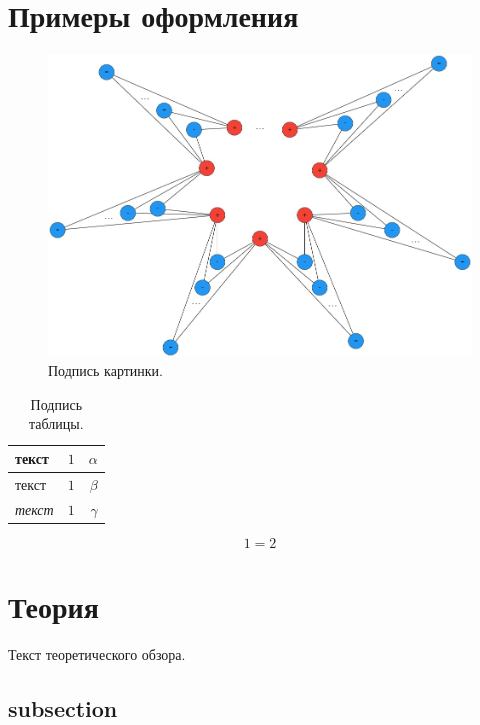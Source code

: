 \documentclass[a4paper, 14pt]{extreport}
\begin{document}
\section{Примеры оформления}

\begin{figure}[h]
    \centering
    \includegraphics[scale=0.25]{img/graph.jpg}
    \caption{Подпись картинки.}
    \label{fig:example fig 1}
\end{figure}

\begin{table}[h]
    \centering
    \caption{Подпись таблицы.}
    \begin{tabular}{lc|r}
        \textbf{текст} & $1$ & $\alpha$ \\
        \hline
        текст & $1$ & $\beta$ \\
        \textit{текст} & $1$ & $\gamma$ \\
    \end{tabular}
    \label{fig:example table 1}
\end{table}

\begin{equation}
    1 = 2
\end{equation}


\section{Теория}

Текст теоретического обзора.

\subsection{subsection}
\end{document}
